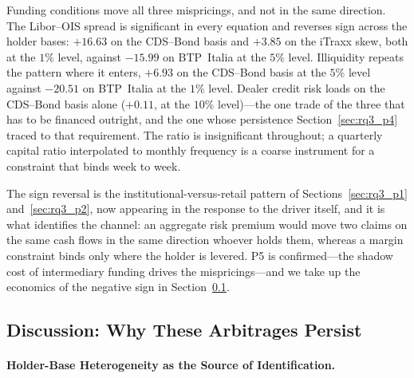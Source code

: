 Funding conditions move all three mispricings, and not in the same
direction. The Libor--OIS spread is significant in every equation and
reverses sign across the holder bases: $+16.63$ on the CDS--Bond basis
and $+3.85$ on the iTraxx skew, both at the $1\%$ level, against
$-15.99$ on BTP~Italia at the $5\%$ level. Illiquidity repeats the
pattern where it enters, $+6.93$ on the CDS--Bond basis at the $5\%$
level against $-20.51$ on BTP~Italia at the $1\%$ level. Dealer credit
risk loads on the CDS--Bond basis alone ($+0.11$, at the $10\%$
level)---the one trade of the three that has to be financed outright,
and the one whose persistence Section~\ref{sec:rq3_p4} traced to that
requirement. The \citet{he2017intermediary} ratio is insignificant
throughout; a quarterly capital ratio interpolated to monthly frequency
is a coarse instrument for a constraint that binds week to week.

The sign reversal is the institutional-versus-retail pattern of
Sections~\ref{sec:rq3_p1} and~\ref{sec:rq3_p2}, now appearing in the
response to the driver itself, and it is what identifies the channel:
an aggregate risk premium would move two claims on the same cash flows
in the same direction whoever holds them, whereas a margin constraint
binds only where the holder is levered. P5 is confirmed---the shadow
cost of intermediary funding drives the mispricings---and we take up
the economics of the negative sign in
Section~\ref{sec:rq3_discussion}.



\subsection{Discussion: Why These Arbitrages Persist}
\label{sec:rq3_discussion}

\paragraph{Holder-Base Heterogeneity as the Source of Identification.}

